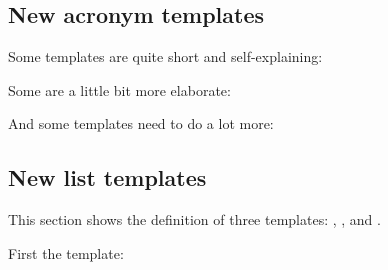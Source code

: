 \documentclass{acro-manual}
\begin{document}
\subsection{New acronym templates}\label{sec:new-acronym-templ}

Some templates are quite short and self-explaining:
\begin{sourcecode}
\end{sourcecode}

Some are a little bit more elaborate:
\begin{sourcecode}
\end{sourcecode}

And some templates need to do a lot more:
\begin{sourcecode}
\end{sourcecode}

\subsection{New list templates}\label{sec:new-list-templates}
This section shows the definition of three templates: ,
, and .

First the  template:
\begin{sourcecode}
\end{sourcecode}
\end{document}
